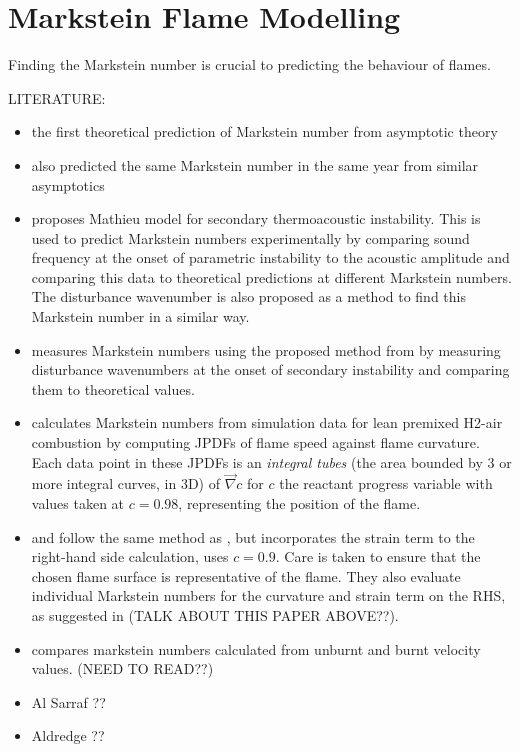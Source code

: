 \section{Markstein Flame Modelling}

Finding the Markstein number is crucial to predicting the behaviour of flames.

LITERATURE:
\begin{itemize}
\item \cite{clavin1982EffectsMolecularDiffusion} the first theoretical prediction of Markstein number from asymptotic theory
\item \cite{matalon1982FlamesGasdynamicDiscontinuities} also predicted the same Markstein number in the same year from similar asymptotics
\item \cite{searby1991ParametricAcousticInstability} proposes Mathieu model for secondary thermoacoustic instability. This is used to predict Markstein numbers experimentally by comparing sound frequency at the onset of parametric instability to the acoustic amplitude and comparing this data to theoretical predictions at different Markstein numbers. The disturbance wavenumber is also proposed as a method to find this Markstein number in a similar way.
\item \cite{delfin2024DeterminationMethodMarkstein} measures Markstein numbers using the proposed method from \cite{searby1991ParametricAcousticInstability} by measuring disturbance wavenumbers at the onset of secondary instability and comparing them to theoretical values.
\item \cite{day2009TurbulenceEffectsCellular} calculates Markstein numbers from simulation data for lean premixed H2-air combustion by computing JPDFs of flame speed against flame curvature. Each data point in these JPDFs is an \emph{integral tubes} (the area bounded by 3 or more integral curves, in 3D) of $\vec{\nabla} c$ for $c$ the reactant progress variable with values taken at $c=0.98$, representing the position of the flame.
\item \cite{howarth2022EmpiricalCharacteristicScaling} and \cite{howarth2023ThermodiffusivelyunstableLeanPremixed} follow the same method as \cite{day2009TurbulenceEffectsCellular}, but incorporates the strain term to the right-hand side calculation, uses $c=0.9$. Care is taken to ensure that the chosen flame surface is representative of the flame. They also evaluate individual Markstein numbers for the curvature and strain term on the RHS, as suggested in \cite{clavin2011CurvedStretchedFlames} (TALK ABOUT THIS PAPER ABOVE??).
\item \cite{davis2002MarksteinNumbersCounterflow} compares markstein numbers calculated from unburnt and burnt velocity values. (NEED TO READ??)
\item Al Sarraf ??
\item Aldredge ??
\end{itemize}




